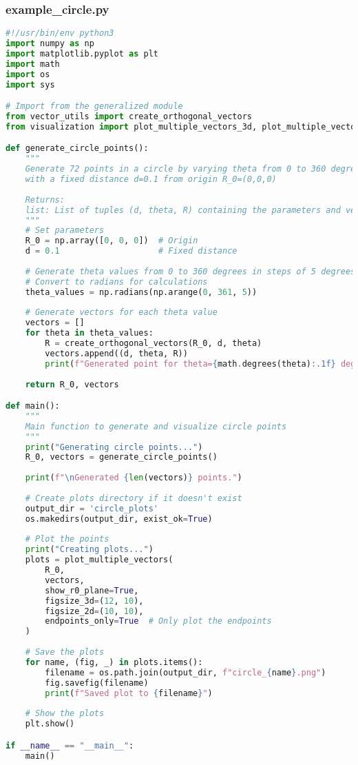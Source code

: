\subsubsection{example\_circle.py}

\begin{lstlisting}[language=Python]
#!/usr/bin/env python3
import numpy as np
import matplotlib.pyplot as plt
import math
import os
import sys

# Import from the generalized module
from vector_utils import create_orthogonal_vectors
from visualization import plot_multiple_vectors_3d, plot_multiple_vectors_2d, plot_multiple_vectors

def generate_circle_points():
    """
    Generate 72 points in a circle by varying theta from 0 to 360 degrees
    with a fixed distance d=0.1 from origin R_0=(0,0,0)
    
    Returns:
    list: List of tuples (d, theta, R) containing the parameters and vectors
    """
    # Set parameters
    R_0 = np.array([0, 0, 0])  # Origin
    d = 0.1                    # Fixed distance
    
    # Generate theta values from 0 to 360 degrees in steps of 5 degrees
    # Convert to radians for calculations
    theta_values = np.radians(np.arange(0, 361, 5))
    
    # Generate vectors for each theta value
    vectors = []
    for theta in theta_values:
        R = create_orthogonal_vectors(R_0, d, theta)
        vectors.append((d, theta, R))
        print(f"Generated point for theta={math.degrees(theta):.1f} deg: {R}")
    
    return R_0, vectors

def main():
    """
    Main function to generate and visualize circle points
    """
    print("Generating circle points...")
    R_0, vectors = generate_circle_points()
    
    print(f"\nGenerated {len(vectors)} points.")
    
    # Create plots directory if it doesn't exist
    output_dir = 'circle_plots'
    os.makedirs(output_dir, exist_ok=True)
    
    # Plot the points
    print("Creating plots...")
    plots = plot_multiple_vectors(
        R_0, 
        vectors,
        show_r0_plane=True,
        figsize_3d=(12, 10),
        figsize_2d=(10, 10),
        endpoints_only=True  # Only plot the endpoints
    )
    
    # Save the plots
    for name, (fig, _) in plots.items():
        filename = os.path.join(output_dir, f"circle_{name}.png")
        fig.savefig(filename)
        print(f"Saved plot to {filename}")
    
    # Show the plots
    plt.show()

if __name__ == "__main__":
    main()
\end{lstlisting}

